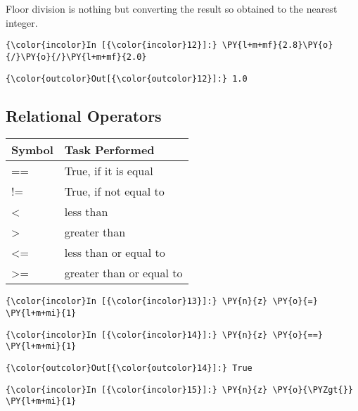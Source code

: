     Floor division is nothing but converting the result so obtained to the
nearest integer.

    \begin{Verbatim}[commandchars=\\\{\}]
{\color{incolor}In [{\color{incolor}12}]:} \PY{l+m+mf}{2.8}\PY{o}{/}\PY{o}{/}\PY{l+m+mf}{2.0}
\end{Verbatim}

            \begin{Verbatim}[commandchars=\\\{\}]
{\color{outcolor}Out[{\color{outcolor}12}]:} 1.0
\end{Verbatim}
        
    \subsection{Relational Operators}\label{relational-operators}

    \begin{longtable}[c]{@{}ll@{}}
\toprule
Symbol & Task Performed\tabularnewline
\midrule
\endhead
== & True, if it is equal\tabularnewline
!= & True, if not equal to\tabularnewline
\textless{} & less than\tabularnewline
\textgreater{} & greater than\tabularnewline
\textless{}= & less than or equal to\tabularnewline
\textgreater{}= & greater than or equal to\tabularnewline
\bottomrule
\end{longtable}

    \begin{Verbatim}[commandchars=\\\{\}]
{\color{incolor}In [{\color{incolor}13}]:} \PY{n}{z} \PY{o}{=} \PY{l+m+mi}{1}
\end{Verbatim}

    \begin{Verbatim}[commandchars=\\\{\}]
{\color{incolor}In [{\color{incolor}14}]:} \PY{n}{z} \PY{o}{==} \PY{l+m+mi}{1}
\end{Verbatim}

            \begin{Verbatim}[commandchars=\\\{\}]
{\color{outcolor}Out[{\color{outcolor}14}]:} True
\end{Verbatim}
        
    \begin{Verbatim}[commandchars=\\\{\}]
{\color{incolor}In [{\color{incolor}15}]:} \PY{n}{z} \PY{o}{\PYZgt{}} \PY{l+m+mi}{1}
\end{Verbatim}

